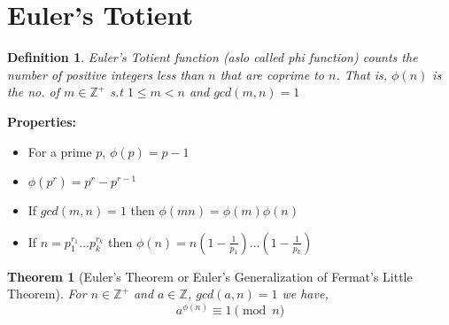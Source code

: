 \documentclass[12pt,a4paper]{article}
\newcommand{\Z}{\mathbb{Z}}
\newtheorem{thm}{Theorem}
\newtheorem{defn}{Definition}
\begin{document}
\section{Euler's Totient}
\begin{defn}\normalfont
	Euler's Totient function (aslo called phi function) counts the number of positive integers less than $n$ that are coprime to $n$. That is, $\phi (n)$ is the no. of $m\in \Z^{+}$ s.t $1\le m < n$ and $gcd(m,n)=1$
\end{defn}
\textbf{Properties: }
\begin{itemize}
	\item For a prime $p$, $\phi (p)=p-1$
	\item $\phi (p^r)=p^r-p^{r-1}$
	\item If $gcd(m,n)=1$ then $\phi(mn)=\phi (m) \phi (n)$
	\item If $n=p_{1}^{r_{1}}\dots p_{k}^{r_{k}}$ then $\phi (n)=n \left(1 - \frac{1}{p_{1}}\right) \dots \left(1-\frac{1}{p_{k}}\right)$
\end{itemize}
\begin{thm}[Euler's Theorem or Euler's Generalization of Fermat's Little Theorem]\normalfont
	For $n \in \Z^{+}$ and $a\in \Z$, $gcd(a,n)=1$ we have,
	$$
		a^{\phi (n)} \equiv 1 \pmod n
	$$
\end{thm}
\end{document}
